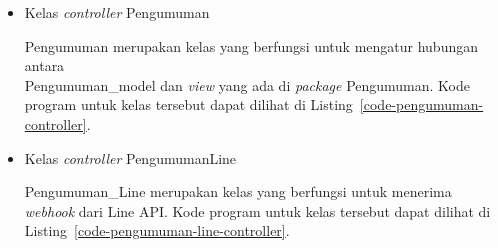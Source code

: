 \begin{itemize}


\item Kelas \textit{controller} Pengumuman

Pengumuman merupakan kelas yang berfungsi untuk mengatur hubungan antara \\
Pengumuman\_model dan \textit{view} yang ada di \textit{package} Pengumuman. Kode program untuk kelas tersebut dapat dilihat di Listing~\ref{code-pengumuman-controller}.



\item Kelas \textit{controller} PengumumanLine

Pengumuman\_Line merupakan kelas yang berfungsi untuk menerima \textit{webhook} dari Line API. Kode program untuk kelas tersebut dapat dilihat di Listing~\ref{code-pengumuman-line-controller}.



\end{itemize}

